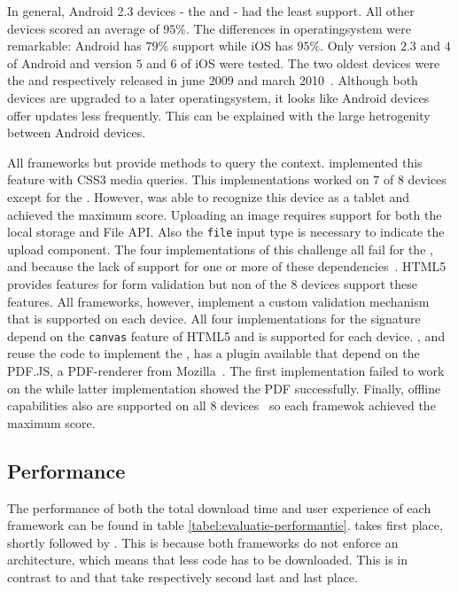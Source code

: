 \documentclass[a4paper]{artikel3}
\newcommand{\code}[1]{\texttt{#1}}
\begin{document}
In general,  Android 2.3 devices - the \htc{} and \gtab{} - had the least support.
All other devices scored an average of $95\%$.
The differences in operatingsystem were remarkable:  Android has $79\%$ support while iOS has $95\%$.
Only version $2.3$ and $4$ of Android and version $5$ and $6$ of iOS were tested.
The two oldest devices were the \iphoneiii{} and \gs{} respectively released in june 2009 and march 2010~\cite{Staff2009,Gideon2010}.
Although both devices are upgraded to a later operatingsystem,  it looks like Android devices offer updates less frequently.%
This can be explained with the large hetrogenity between Android devices.

All frameworks but \jqma{} provide methods to query the context.
\jqma{} implemented this feature with CSS3 media queries.
This implementations worked on $7$ of $8$ devices except for the \gtab.
However,  \kendob{} was able to recognize this device as a tablet and achieved the maximum score.
Uploading an image requires support for both the local storage and File API.  
Also the \code{file} input type is necessary to indicate the upload component.
The four implementations of this challenge all fail for the \htc{}, \gtab{} and \ipadi{} because the lack of support for one or more of these dependencies~\cite{Deveria2013c}.
HTML5 provides features for form validation but non of the $8$ devices support these features.
All frameworks, however,  implement a custom validation mechanism that is supported on each device.
All four implementations for the signature depend on the \code{canvas} feature of HTML5 and is supported for each device.
\kendob{}, \jqma{} and \lungo{} reuse the code to implement the , \sta{} has a plugin available that depend on the PDF.JS,  a PDF-renderer from Mozilla~\cite{Gal2010}.
The first implementation failed to work on the \gs{} while latter implementation showed the PDF successfully.
Finally, offline capabilities also are supported on all $8$ devices~\cite{Deveria2013c} so each framewok achieved the maximum score.

  

\subsection{Performance} %
\label{sec:evaluation-performance}
The performance of both the total download time and user experience of each framework can be found in table \ref{tabel:evaluatie-performantie}.
\jqma{} takes first place, shortly followed by \lungo{}.
This is because both frameworks do not enforce an architecture, which means that less \js{} code has to be downloaded.
This is in contrast to \kendob{} and \sta{} that take respectively second last and last place.
\end{document}
